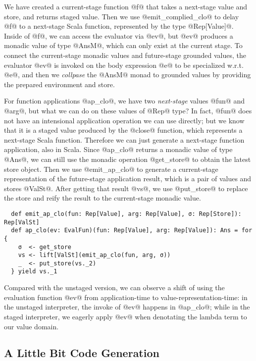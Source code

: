 We have created a current-stage function @f@ that takes a next-stage value and
store, and returns staged value. Then we use @emit_complied_clo@ to delay @f@ to
a next-stage Scala function, represented by the type @Rep[Value]@. Inside of
@f@, we can access the evaluator via @ev@, but @ev@ produces a monadic value of
type @AnsM@, which can only exist at the current stage. To connect the
current-stage monadic values and future-stage grounded values, the evaluator
@ev@ is invoked on the body expression @e@ to be specialized w.r.t. @e@, and
then we \textit{collpase} the @AnsM@ monad to grounded values by providing the
prepared environment and store.

For function applications @ap_clo@, we have two \textit{next-stage} values @fun@
and @arg@, but what we can do on these values of @Rep@ type? In fact, @fun@ does
not have an intensional application operation we can use directly; but we know
that it is a staged value produced by the @close@ function, which represents a
next-stage Scala function. Therefore we can just generate a next-stage function
application, also in Scala. Since @ap_clo@ returns a monadic value of type
@Ans@, we can still use the monadic operation @get_store@ to obtain the latest
store object. Then we use @emit_ap_clo@ to generate a current-stage
representation of the future-stage application result, which is a pair of values
and stores @ValSt@. After getting that result @vs@, we use @put_store@ to
replace the store and reify the result to the current-stage monadic value.

\begin{lstlisting}
  def emit_ap_clo(fun: Rep[Value], arg: Rep[Value], σ: Rep[Store]): Rep[ValSt]
  def ap_clo(ev: EvalFun)(fun: Rep[Value], arg: Rep[Value]): Ans = for {
    σ  <- get_store
    vs <- lift[ValSt](emit_ap_clo(fun, arg, σ))
    _  <- put_store(vs._2)
  } yield vs._1
\end{lstlisting}

Compared with the unstaged version, we can observe a shift of using the
evaluation function @ev@ from application-time to value-representation-time: in
the unstaged interpreter, the invoke of @ev@ happens in @ap_clo@; while in the
staged interpreter, we eagerly apply @ev@ when denotating the lambda term to our
value domain.

\subsection{A Little Bit Code Generation}

